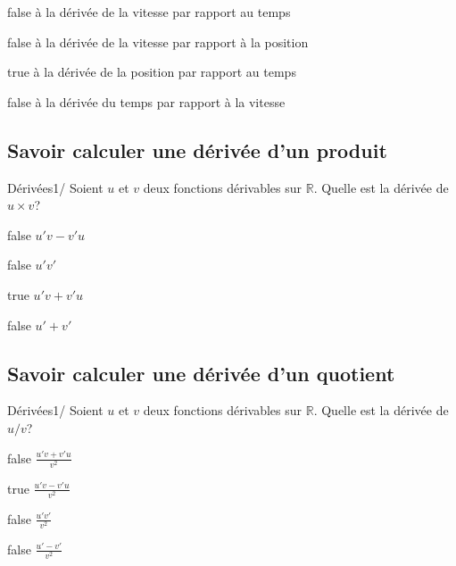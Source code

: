 \documentclass[11pt]{article}
\begin{document}
            \begin{reponses}
                \item[false] à la dérivée de la vitesse par rapport au temps
                \item[false] à la dérivée de la vitesse par rapport à la position
                \item[true] à la dérivée de la position par rapport au temps
                \item[false] à la dérivée du temps par rapport à la vitesse
            \end{reponses}

        \subsection{Savoir calculer une dérivée d'un produit}
        
        	\begin{question}{23}{Dérivées}{1}{/}
				Soient $u$ et $v$ deux fonctions dérivables sur $\mathbb{R}$. Quelle est la dérivée de $u\times v$?
            \end{question}

            \begin{reponses}
            	\item[false] $u'v-v'u$
            	\item[false] $u'v'$
                \item[true] $u'v+v'u$
                \item[false] $u'+v'$
            \end{reponses}

        \subsection{Savoir calculer une dérivée d'un quotient}
        
        	\begin{question}{24}{Dérivées}{1}{/}
				Soient $u$ et $v$ deux fonctions dérivables sur $\mathbb{R}$. Quelle est la dérivée de $u/v$?
            \end{question}

            \begin{reponses}
            	\item[false] $\frac{u'v+v'u}{v^2}$
            	\item[true] $\frac{u'v-v'u}{v^2}$
                \item[false] $\frac{u'v'}{v^2}$
                \item[false] $\frac{u'-v'}{v^2}$
            \end{reponses}
\end{document}
